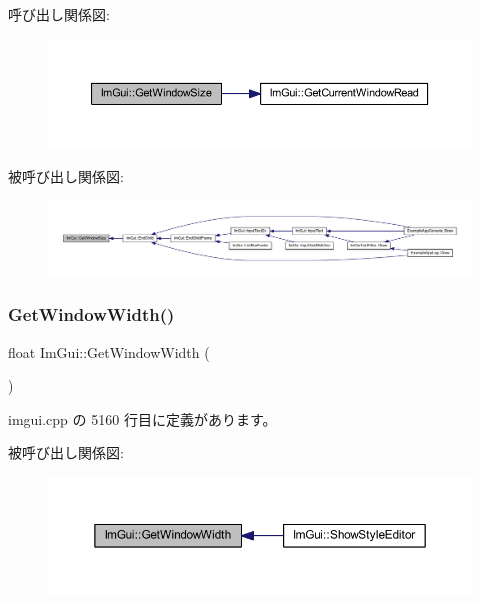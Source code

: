 呼び出し関係図\+:\nopagebreak
\begin{figure}[H]
\begin{center}
\leavevmode
\includegraphics[width=350pt]{namespace_im_gui_aaa5c0bfac7125ba9850a08b6db2e90c9_cgraph}
\end{center}
\end{figure}
被呼び出し関係図\+:\nopagebreak
\begin{figure}[H]
\begin{center}
\leavevmode
\includegraphics[width=350pt]{namespace_im_gui_aaa5c0bfac7125ba9850a08b6db2e90c9_icgraph}
\end{center}
\end{figure}
\mbox{\label{namespace_im_gui_a471ff23945b99541c506dbdc2a9004cf}} 
\subsubsection{\texorpdfstring{Get\+Window\+Width()}{GetWindowWidth()}}
{\footnotesize\ttfamily float Im\+Gui\+::\+Get\+Window\+Width (\begin{DoxyParamCaption}{ }\end{DoxyParamCaption})}



 imgui.\+cpp の 5160 行目に定義があります。

被呼び出し関係図\+:\nopagebreak
\begin{figure}[H]
\begin{center}
\leavevmode
\includegraphics[width=350pt]{namespace_im_gui_a471ff23945b99541c506dbdc2a9004cf_icgraph}
\end{center}
\end{figure}
\mbox{\label{namespace_im_gui_ad8705ac3b718c1b2e84e7b8c34f90249}} 
